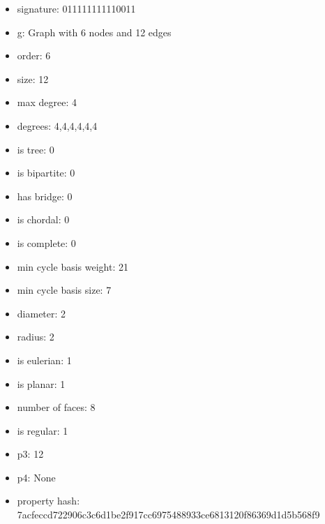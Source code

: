 \begin{itemize}
\item signature: 011111111110011
\item g: Graph with 6 nodes and 12 edges
\item order: 6
\item size: 12
\item max degree: 4
\item degrees: 4,4,4,4,4,4
\item is tree: 0
\item is bipartite: 0
\item has bridge: 0
\item is chordal: 0
\item is complete: 0
\item min cycle basis weight: 21
\item min cycle basis size: 7
\item diameter: 2
\item radius: 2
\item is eulerian: 1
\item is planar: 1
\item number of faces: 8
\item is regular: 1
\item p3: 12
\item p4: None
\item property hash: 7acfeccd722906c3c6d1be2f917cc6975488933ce6813120f86369d1d5b568f9
\end{itemize}
\newpage
